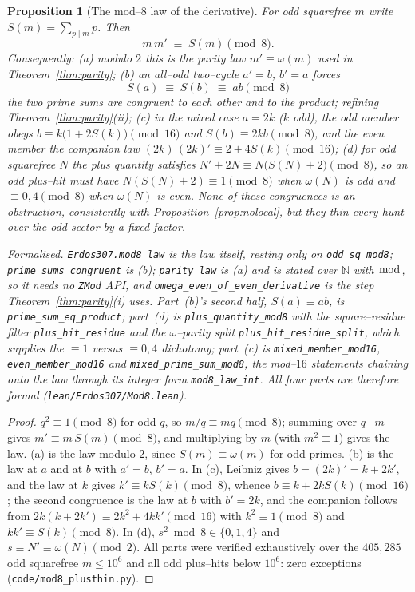 \documentclass[11pt]{article}
\newtheorem{proposition}[theorem]{Proposition}
\theoremstyle{definition}
\newcommand{\NN}{\mathbb{N}}
\begin{document}
\begin{proposition}[The mod--$8$ law of the derivative]\label{prop:mod8}
For odd squarefree $m$ write $S(m)=\sum_{p\mid m}p$. Then
\[ m\,m'\;\equiv\;S(m)\pmod 8. \]
Consequently: \textup{(a)} modulo $2$ this is the parity law $m'\equiv\omega(m)$ used in
Theorem~\ref{thm:parity}; \textup{(b)} an all--odd two--cycle $a'=b$, $b'=a$ forces
\[ S(a)\;\equiv\;S(b)\;\equiv\;ab\pmod 8 \]
the two prime sums are congruent to each other and to the product; refining
Theorem~\ref{thm:parity}(ii); \textup{(c)} in the mixed case $a=2k$ ($k$ odd), the odd member obeys
$b\equiv k\bigl(1+2S(k)\bigr)\pmod{16}$ and $S(b)\equiv2kb\pmod8$, and the even member the companion
law $(2k)\,(2k)'\equiv2+4S(k)\pmod{16}$; \textup{(d)} for odd squarefree $N$ the plus quantity
satisfies $N'+2N\equiv N\bigl(S(N)+2\bigr)\pmod8$, so an odd plus--hit must have
$N(S(N)+2)\equiv1\pmod8$ when $\omega(N)$ is odd and $\equiv0,4\pmod8$ when $\omega(N)$ is even.
None of these congruences is an obstruction, consistently with Proposition~\ref{prop:nolocal},
but they thin every hunt over the odd sector by a fixed factor.

\textup{Formalised.} \texttt{Erdos307.mod8\_law} is the law itself, resting only on
\texttt{odd\_sq\_mod8}; \texttt{prime\_sums\_congruent} is \textup{(b)}; \texttt{parity\_law} is
\textup{(a)} and is stated over $\NN$ with $\bmod$, so it needs no \texttt{ZMod} API, and
\texttt{omega\_even\_of\_even\_derivative} is the step Theorem~\ref{thm:parity}\textup{(i)} uses.
Part~\textup{(b)}'s second half, $S(a)\equiv ab$, is
\texttt{prime\_sum\_eq\_product}; part~\textup{(d)} is \texttt{plus\_quantity\_mod8} with the
square--residue filter \texttt{plus\_hit\_residue} and the $\omega$--parity split
\texttt{plus\_hit\_residue\_split}, which supplies the $\equiv1$ versus $\equiv0,4$ dichotomy;
part~\textup{(c)} is
\texttt{mixed\_member\_mod16}, \texttt{even\_member\_mod16} and \texttt{mixed\_prime\_sum\_mod8},
the mod--$16$ statements chaining onto the law through its integer form \texttt{mod8\_law\_int}. All
four parts are therefore formal \textup{(\texttt{lean/Erdos307/Mod8.lean})}.
\end{proposition}
\begin{proof}
$q^2\equiv1\pmod8$ for odd $q$, so $m/q\equiv mq\pmod8$; summing over $q\mid m$ gives
$m'\equiv m\,S(m)\pmod8$, and multiplying by $m$ (with $m^2\equiv1$) gives the law. (a) is the law
modulo $2$, since $S(m)\equiv\omega(m)$ for odd primes. (b) is the law at $a$ and at $b$ with $a'=b$,
$b'=a$. In (c), Leibniz gives $b=(2k)'=k+2k'$, and the law at $k$ gives $k'\equiv kS(k)\pmod8$,
whence $b\equiv k+2kS(k)\pmod{16}$; the second congruence is the law at $b$ with $b'=2k$, and the
companion follows from $2k(k+2k')\equiv2k^2+4kk'\pmod{16}$ with $k^2\equiv1\pmod8$ and
$kk'\equiv S(k)\pmod8$. In (d), $s^2\bmod8\in\{0,1,4\}$ and $s\equiv N'\equiv\omega(N)\pmod2$.
All parts were verified exhaustively over the $405{,}285$ odd squarefree $m\le10^6$ and all odd
plus--hits below $10^6$: zero exceptions (\texttt{code/mod8\_plusthin.py}).
\end{proof}
\end{document}

